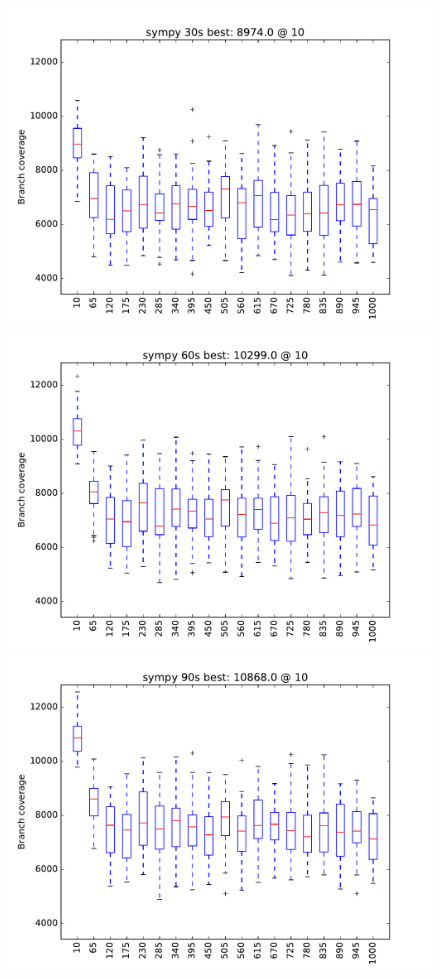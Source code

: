 \begin{figure}
\includegraphics[width=\columnwidth]{graphs/sympyrand30}
\includegraphics[width=\columnwidth]{graphs/sympyrand60}
\includegraphics[width=\columnwidth]{graphs/sympyrand90}
\end{figure}

